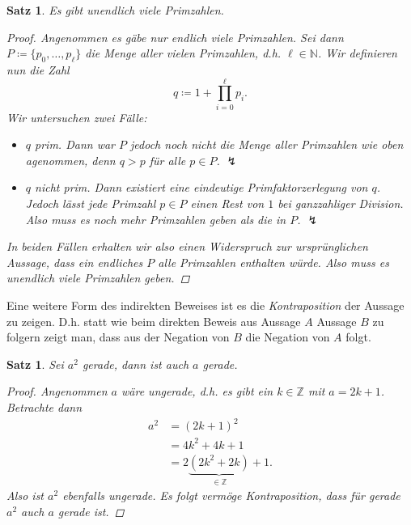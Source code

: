 \documentclass[11pt, a4paper]{article}
\theoremstyle{definition}
\theoremstyle{plain}
\newtheorem{theorem}[definition]{Satz}
\numberwithin{equation}{section}
\begin{document}
\begin{theorem}\label{thm:primes}
	Es gibt unendlich viele Primzahlen.
	\begin{proof}
		Angenommen es gäbe nur endlich viele Primzahlen. Sei dann $P \coloneqq \{p_0, \ldots, p_\ell\}$ die Menge aller vielen Primzahlen, d.h. $\ell \in \mathbb{N}$. Wir definieren nun die Zahl 
		$$
			q \coloneqq 1 + \prod_{i=0}^\ell p_i.
		$$
		Wir untersuchen zwei Fälle:
		\begin{itemize}
			\item $q$ prim. Dann war $P$ jedoch noch nicht die Menge aller Primzahlen wie oben agenommen, denn $q > p$ für alle $p \in P$. $\lightning$
			\item $q$ nicht prim. Dann existiert eine eindeutige Primfaktorzerlegung von $q$. Jedoch lässt jede Primzahl $p \in P$ einen Rest von $1$ bei ganzzahliger Division. Also muss es noch mehr Primzahlen geben als die in $P$. $\lightning$
		\end{itemize}
		In beiden Fällen erhalten wir also einen Widerspruch zur ursprünglichen Aussage, dass ein endliches $P$ alle Primzahlen enthalten würde. Also muss es unendlich viele Primzahlen geben.
	\end{proof}
\end{theorem}
Eine weitere Form des indirekten Beweises ist es die \textit{Kontraposition} der Aussage zu zeigen. D.h. statt wie beim direkten Beweis aus Aussage $A$ Aussage $B$ zu folgern zeigt man, dass aus der Negation von $B$ die Negation von $A$ folgt.
\begin{theorem}
	Sei $a^2$ gerade, dann ist auch $a$ gerade.
	\begin{proof}
		Angenommen $a$ wäre ungerade, d.h. es gibt ein $k \in \mathbb{Z}$ mit $a = 2k + 1$. Betrachte dann
		\begin{align*}
			a^2 &= (2k + 1)^2\\
			&= 4k^2 + 4k + 1\\
			&= 2\underbrace{(2k^2 + 2k)}_{\in \mathbb{Z}} + 1.
		\end{align*}
		Also ist $a^2$ ebenfalls ungerade. Es folgt vermöge Kontraposition, dass für gerade $a^2$ auch $a$ gerade ist.
	\end{proof}
\end{theorem}
\end{document}
